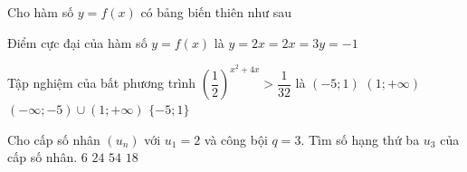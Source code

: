 \begin{ex}%
	Cho hàm số $ y=f(x)$ có bảng biến thiên như sau
\begin{center}
\end{center}
	Điểm cực đại của hàm số $ y=f(x)$ là
	\choice
	{$y=2$}{$x=2$}{\True $x=3$}{$y=-1$}
\end{ex}

\begin{ex}%
	Tập nghiệm của bất phương trình $\left(\dfrac{1}{2}\right)^{x^2+4x}>\dfrac{1}{32}$ là
	\choice
	{\True $(-5;1)$}
	{$(1;+\infty)$}
	{$(-\infty ;-5)\cup (1;+\infty)$}
	{\True $\{-5;1\}$}
\end{ex}

\begin{ex}%
	Cho cấp số nhân $(u_n)$ với $u_1=2$ và công bội $q=3$. Tìm số hạng thứ ba $u_3$ của cấp số nhân.
	\choice
	{$6$}
	{$24$}
	{$54$}
	{\True $18$}
\end{ex}


